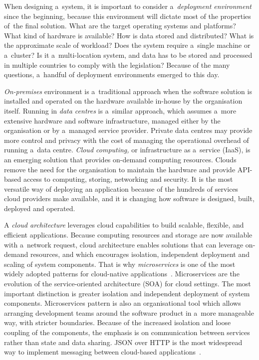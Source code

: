 \documentclass[12pt]{article}
\begin{document}
When designing a~system, it is important to consider a~\emph{deployment environment} since the beginning, because this environment will dictate most of the properties of~the final solution. What are the target operating systems and platforms? What kind of hardware is available? How is data stored and distributed? What is the approximate scale of workload? Does the system require a~single machine or a~cluster? Is it a~multi-location system, and data has to be stored and processed in multiple countries to comply with the legislation? Because of the many questions, a~handful of deployment environments emerged to this day.

\emph{On-premises} environment is a~traditional approach when the software solution is installed and operated on the hardware available in-house by the organisation itself. Running in \emph{data centres} is a~similar approach, which assumes a~more extensive hardware and software infrastructure, managed either by the organisation or by a~managed service provider. Private data centres may provide more control and privacy with the cost of managing the operational overhead of running a~data centre. \emph{Cloud computing,} or infrastructure as a~service (IaaS), is an emerging solution that provides on-demand computing resources. Clouds remove the need for the organisation to maintain the hardware and provide API-based access to computing, storing, networking and security. It is the most versatile way of deploying an application because of the hundreds of services cloud providers make available, and it is changing how software is designed, built, deployed and operated.

A \emph{cloud architecture} leverages cloud capabilities to build scalable, flexible, and efficient applications. Because computing resources and storage are now available with a~network request, cloud architecture enables solutions that can leverage on-demand resources, and which encourages isolation, independent deployment and scaling of system components. That is why \emph{microservices} is one of the most widely adopted patterns for cloud-native applications~\cite{linthicum_practical_2016}. Microservices are the evolution of the service-oriented architecture (SOA) for cloud settings. The most important distinction is greater isolation and independent deployment of system components. Microservices pattern is also an organisational tool which allows arranging development teams around the software product in a~more manageable way, with stricter boundaries. Because of the increased isolation and loose coupling of the components, the emphasis is on communication between services rather than state and data sharing. JSON over HTTP is the most widespread way to implement messaging between cloud-based applications~\cite{sill_design_2016}.
\end{document}
